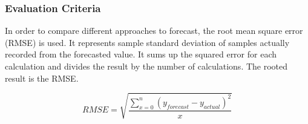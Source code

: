 \subsubsection{Evaluation Criteria}
In order to compare different approaches to forecast, the root mean square error (RMSE) is used. It represents sample standard deviation of samples actually recorded from the forecasted value. It sums up the squared error for each calculation and divides the result by the number of calculations.\newline
The rooted result is the RMSE.
\begin{center}
\begin{equation}
RMSE = \sqrt{\frac{\sum^{n}_{x=0}{(y_{forecast} - y_{actual})^{2}}}{x}}
\end{equation}
\end{center}
